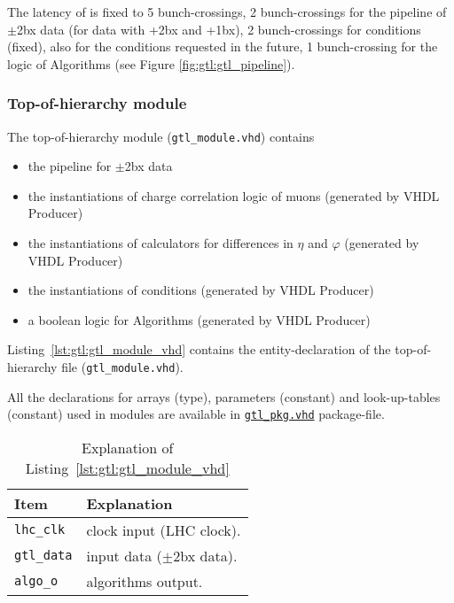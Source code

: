 The latency of \ugtl is fixed to 5 bunch-crossings,
2 bunch-crossings for the pipeline of $\pm$2bx data (for data with +2bx and +1bx), 2 bunch-crossings for conditions (fixed), also for the conditions requested in the future, 1 bunch-crossing for the logic of Algorithms (see Figure \ref{fig:gtl:gtl_pipeline}).\\

\subsubsection{Top-of-hierarchy module}
\label{sec:gtl:top_module}

The top-of-hierarchy module (\texttt{gtl\_module.vhd}) contains
\begin {itemize}
\item the pipeline for $\pm$2bx data
\item the instantiations of charge correlation logic of muons (generated by VHDL Producer)
\item the instantiations of calculators for differences in $\eta$ and $\varphi$ (generated by VHDL Producer)
\item the instantiations of conditions (generated by VHDL Producer)
\item a boolean logic for Algorithms (generated by VHDL Producer)
\end {itemize}

Listing~\ref{lst:gtl:gtl_module_vhd} contains the entity-declaration of the top-of-hierarchy file (\texttt{gtl\_module.vhd}).

All the declarations for arrays (\textquotesingle type\textquotesingle ), parameters (\textquotesingle constant\textquotesingle ) and look-up-tables (\textquotesingle constant\textquotesingle ) used in modules are available in \href{\gitbranch/firmware/hdl/packages/gtl_pkg.vhd}{\texttt{\textquotesingle gtl\_pkg.vhd\textquotesingle }} package-file.

\clearpage



\medskip
\begin{table}
\footnotesize
\caption{Explanation of Listing~\ref{lst:gtl:gtl_module_vhd}}
\vspace{5mm}
\centering
\begin{tabular}{l p{}}
\toprule
{Item} & {Explanation}\\
\midrule
\verb|lhc_clk| & clock input (LHC clock).\\
\verb|gtl_data| & input data ($\pm$2bx data).\\
\verb|algo_o| & algorithms output.\\
\bottomrule
\end{tabular}
\label{tab:gtl:explanation_fdl_module_vhd}
\end{table}


